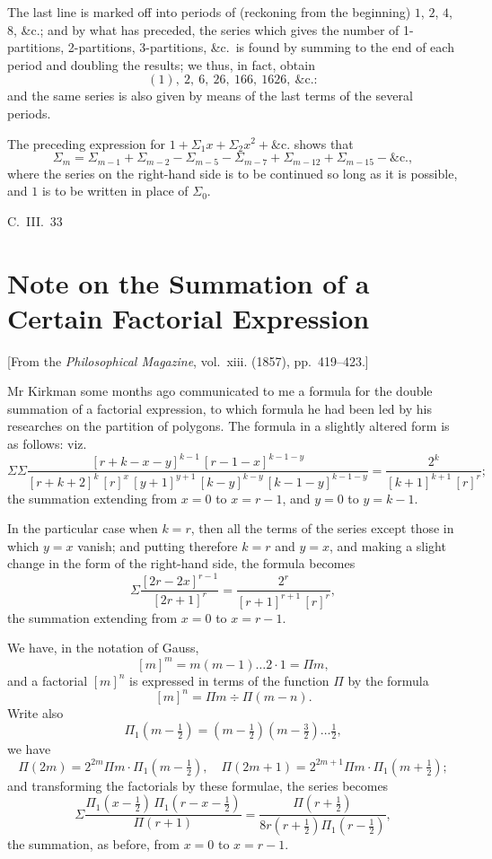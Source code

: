 \documentclass[11pt,a4paper]{article}
\theoremstyle{plain}
\begin{document}
The last line is marked off into periods of (reckoning from the beginning) $1$, $2$, $4$, $8$, \&c.; and by what has preceded, the series which gives the number of 1-partitions, 2-partitions, 3-partitions, \&c.\ is found by summing to the end of each period and doubling the results; we thus, in fact, obtain
\[
(1),\ 2,\ 6,\ 26,\ 166,\ 1626,\ \&\text{c.}:
\]
and the same series is also given by means of the last terms of the several periods.

The preceding expression for $1 + \Sigma_1 x + \Sigma_2 x^2 + \&\text{c.}$
shows that
\[
\Sigma_m = \Sigma_{m-1} + \Sigma_{m-2} - \Sigma_{m-5} - \Sigma_{m-7} + \Sigma_{m-12} + \Sigma_{m-15} - \&\text{c.},
\]
where the series on the right-hand side is to be continued so long as it is possible, and $1$ is to be written in place of $\Sigma_0$.

\hfill C.~III.~33
\newpage


\section{Note on the Summation of a Certain Factorial Expression}
\label{sec:205}

[From the \textit{Philosophical Magazine}, vol.~xiii. (1857), pp.~419--423.]
\vspace{1em}

Mr Kirkman some months ago communicated to me a formula for the double summation of a factorial expression, to which formula he had been led by his researches on the partition of polygons. The formula in a slightly altered form is as follows: viz.
\[
\Sigma\Sigma \frac{[r+k-x-y]^{k-1}\,[r-1-x]^{k-1-y}}{[r+k+2]^{k}\,[r]^{x}\,[y+1]^{y+1}\,[k-y]^{k-y}\,[k-1-y]^{k-1-y}} = \frac{2^k}{[k+1]^{k+1}\,[r]^{r}};
\]
the summation extending from $x=0$ to $x=r-1$, and $y=0$ to $y=k-1$.

In the particular case when $k=r$, then all the terms of the series except those in which $y=x$ vanish; and putting therefore $k=r$ and $y=x$, and making a slight change in the form of the right-hand side, the formula becomes
\[
\Sigma \frac{[2r-2x]^{r-1}}{[2r+1]^{r}} = \frac{2^r}{[r+1]^{r+1}\,[r]^{r}},
\]
the summation extending from $x=0$ to $x=r-1$.

We have, in the notation of Gauss,
\[
[m]^m = m(m-1)\ldots 2 \cdot 1 = \Pi m,
\]
and a factorial $[m]^n$ is expressed in terms of the function $\Pi$ by the formula
\[
[m]^n = \Pi m \div \Pi(m-n).
\]
Write also
\[
\Pi_1(m - \tfrac{1}{2}) = (m - \tfrac{1}{2})(m - \tfrac{3}{2})\ldots \tfrac{1}{2},
\]
we have
\[
\Pi(2m) = 2^{2m} \Pi m \cdot \Pi_1(m - \tfrac{1}{2}), \quad \Pi(2m+1) = 2^{2m+1} \Pi m \cdot \Pi_1(m + \tfrac{1}{2});
\]
and transforming the factorials by these formulae, the series becomes
\[
\Sigma \frac{\Pi_1(x - \tfrac{1}{2})\,\Pi_1(r - x - \tfrac{1}{2})}{\Pi(r+1)} = \frac{\Pi(r + \tfrac{1}{2})}{8r(r + \tfrac{1}{2})\Pi_1(r - \tfrac{1}{2})},
\]
the summation, as before, from $x=0$ to $x=r-1$.
\end{document}
